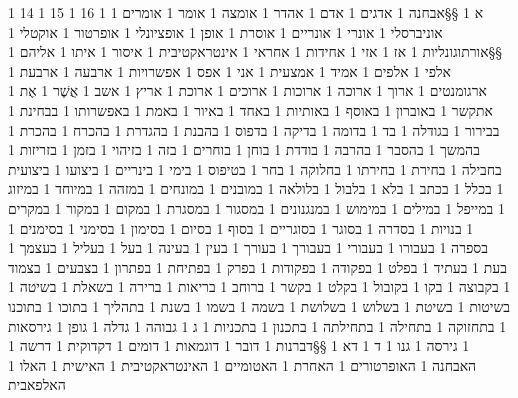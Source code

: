       1 14
      1 15
      1 16
      1 א
      1 §§אבחנה
      1 אדגים
      1 אדם
      1 אהדר
      1 אומצה
      1 אומר
      1 אומרים
      1 אוניברסלי
      1 אונרי
      1 אונריים
      1 אוסרת
      1 אופן
      1 אופציונלי
      1 אופרטור
      1 אוקטלי
      1 §§אורתוגונליות
      1 אז
      1 אזי
      1 אחידות
      1 אחראי
      1 אינטראקטיבית
      1 איסור
      1 איתו
      1 אליהם
      1 אלפי
      1 אלפים
      1 אמיד
      1 אמצעית
      1 אני
      1 אפס
      1 אפשרויות
      1 ארבעה
      1 ארבעת
      1 ארגומנטים
      1 ארוך
      1 ארוכה
      1 ארוכות
      1 ארוכים
      1 ארוכת
      1 אריץ
      1 אשב
      1 אֲשֶׁר
      1 אֶת
      1 אתקשר
      1 באוברון
      1 באוסף
      1 באותיות
      1 באחד
      1 באיור
      1 באמת
      1 באפשרותו
      1 בבחינת
      1 בבירור
      1 בגודלה
      1 בד
      1 בדומה
      1 בדיקה
      1 בדפוס
      1 בהבנת
      1 בהגדרת
      1 בהכרח
      1 בהכרת
      1 בהמשך
      1 בהסבר
      1 בהרבה
      1 בודדת
      1 בוחן
      1 בוחרים
      1 בזה
      1 בזיהוי
      1 בזמן
      1 בזריזות
      1 בחבילה
      1 בחירת
      1 בחירתו
      1 בחלוקה
      1 בחר
      1 בטיפוס
      1 בימי
      1 בינריים
      1 ביצועו
      1 ביצועית
      1 בכלל
      1 בכתב
      1 בלא
      1 בלבול
      1 בלולאה
      1 במובנים
      1 במונחים
      1 במזהה
      1 במיוחד
      1 במיזוג
      1 במייפל
      1 במילים
      1 במימוש
      1 במנגנונים
      1 במסגור
      1 במסגרת
      1 במקום
      1 במקור
      1 במקרים
      1 בנויות
      1 בסדרה
      1 בסוגר
      1 בסוגריים
      1 בסוף
      1 בסיום
      1 בסימון
      1 בסימני
      1 בסימנים
      1 בספרה
      1 בעבורו
      1 בעבורי
      1 בעבורך
      1 בעורך
      1 בעין
      1 בעינה
      1 בעל
      1 בעליל
      1 בעצמך
      1 בעת
      1 בעתיד
      1 בפלט
      1 בפקודה
      1 בפקודות
      1 בפרק
      1 בפתיחת
      1 בפתרון
      1 בצבעים
      1 בצמוד
      1 בקבוצה
      1 בקו
      1 בקובול
      1 בקלט
      1 בקשר
      1 ברוחב
      1 בריאות
      1 ברירה
      1 בשאלת
      1 בשיטה
      1 בשיטות
      1 בשיטת
      1 בשלוש
      1 בשלושת
      1 בשמה
      1 בשמו
      1 בשנת
      1 בתהליך
      1 בתוכו
      1 בתוכנו
      1 בתחזוקה
      1 בתחילה
      1 בתחילתה
      1 בתכנון
      1 בתכניות
      1 ג
      1 גבוהה
      1 גדלה
      1 גופן
      1 גירסאות
      1 גירסה
      1 גנו
      1 ד
      1 דא
      1 §§דברנות
      1 דובר
      1 דוגמאות
      1 דומים
      1 דקדוקית
      1 דרשה
      1 האבחנה
      1 האופרטורים
      1 האחרת
      1 האטומיים
      1 האינטראקטיבית
      1 האישית
      1 האלו
      1 האלפאבית
